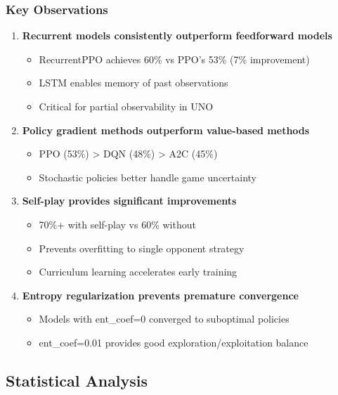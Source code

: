 \documentclass[12pt,a4paper]{article}
\begin{document}
\subsubsection{Key Observations}
\begin{enumerate}
    \item \textbf{Recurrent models consistently outperform feedforward models}
    \begin{itemize}
        \item RecurrentPPO achieves 60\% vs PPO's 53\% (7\% improvement)
        \item LSTM enables memory of past observations
        \item Critical for partial observability in UNO
    \end{itemize}
   \newpage
    \item \textbf{Policy gradient methods outperform value-based methods}
    \begin{itemize}
        \item PPO (53\%) > DQN (48\%) > A2C (45\%)
        \item Stochastic policies better handle game uncertainty
    \end{itemize}
   
    \item \textbf{Self-play provides significant improvements}
    \begin{itemize}
        \item 70\%+ with self-play vs 60\% without
        \item Prevents overfitting to single opponent strategy
        \item Curriculum learning accelerates early training
    \end{itemize}
   
    \item \textbf{Entropy regularization prevents premature convergence}
    \begin{itemize}
        \item Models with ent\_coef=0 converged to suboptimal policies
        \item ent\_coef=0.01 provides good exploration/exploitation balance
    \end{itemize}
\end{enumerate}
\subsection{Statistical Analysis}
\end{document}
